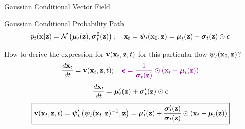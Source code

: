 \documentclass{beamer}
\begin{document}
\begin{frame}{Gaussian Conditional Vector Field}
	\begin{block}{Gaussian Conditional Probability Path}
		\vspace{-0.5cm}
		\[
			p_t(\bx | \bz) = \cN\left(\bmu_t(\bz), \bsigma_t^2(\bz)\right); \quad \bx_t = \bpsi_t(\bx_0, \bz) = \bmu_t(\bz) + \bsigma_t(\bz) \odot \bepsilon
		\]
		\vspace{-0.5cm}
	\end{block}
	\eqpause
	How to derive the expression for $\bv(\bx_t, \bz, t)$ for this particular flow $\bpsi_t(\bx_0, \bz)$?
	\eqpause
	\vspace{-0.3cm}
	\[
		\frac{d\bx_t}{dt} = \bv(\bx_t, \bz, t); \quad {\color{violet}\bepsilon = \frac{1}{\bsigma_t(\bz)} \odot (\bx_t - \bmu_t(\bz))}
	\]
	\eqpause
	\[
		\frac{d\bx_t}{dt} = \bmu_t'(\bz) + \bsigma_t'(\bz) \odot {\color{violet}\bepsilon} 
	\]
	\eqpause
	\[
		\boxed{\bv(\bx_t, \bz, t) = \bpsi_t'\left(\bpsi_t(\bx_t, \bz)^{-1}, \bz\right) = \bmu_t'(\bz) + \frac{\bsigma_t'(\bz)}{\bsigma_t(\bz)} \odot (\bx_t - \bmu_t(\bz))}
	\]
\end{frame}
\end{document}

